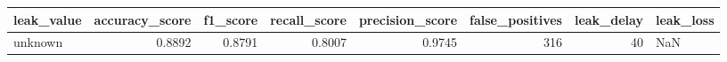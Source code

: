\begin{tabular}{lrrrrrrl}
\toprule
leak\_value & accuracy\_score & f1\_score & recall\_score & precision\_score & false\_positives & leak\_delay & leak\_loss \\
\midrule
unknown & 0.8892 & 0.8791 & 0.8007 & 0.9745 & 316 & 40 & NaN \\
\bottomrule
\end{tabular}
